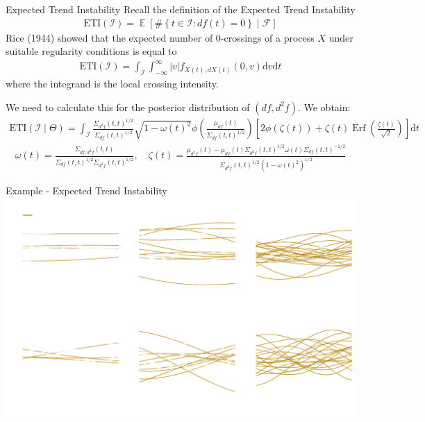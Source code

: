 \documentclass[ignorenonframetext,xcolor=pdflatex,table,dvipsnames,serif]{beamer}
\DeclareMathOperator{\E}{\mathbb{E}}
\DeclareMathOperator{\Erf}{Erf}
\begin{document}
\begin{frame}{Expected Trend Instability}
  Recall the definition of the Expected Trend Instability
  \begin{align*}
    \mathrm{ETI}(\mathcal{I}) = \E[\#\left\{t \in \mathcal{I} : df(t) = 0\right\} \mid \mathcal{F}]
  \end{align*}
  Rice (1944) showed that the expected number of 0-crossings of a process $X$ under suitable regularity conditions is equal to
  \begin{align*}
    \mathrm{ETI}(\mathcal{I}) = \int_\mathcal{I}\int_{-\infty}^\infty |v| f_{X(t), dX(t)}(0, v)\mathrm{d}v\mathrm{d}t
  \end{align*}
  where the integrand is the \alert{local crossing intensity}. 
  
  \pause
  
  \vspace{0.5cm}
  We need to calculate this for the posterior distribution of $(df, d^2\!f)$. We obtain:
{\tiny
  \begin{align*}
    \mathrm{ETI}(\mathcal{I} \mid \Theta) = \int_{\mathcal{I}} \frac{\Sigma_{d^2\!f}(t,t)^{1/2}}{\Sigma_{df}(t,t)^{1/2}} \sqrt{1 - \omega(t)^2}   \phi\left(\frac{\mu_{df}(t)}{\Sigma_{df}(t,t)^{1/2}}\right)\left[2\phi(\zeta(t)) + \zeta(t) \Erf\left(\frac{\zeta(t)}{\sqrt{2}}\right)\right]\mathrm{d}t
  \end{align*}
  \begin{align*}
  \omega(t) = \frac{\Sigma_{df,d^2\!f}(t,t)}{\Sigma_{df}(t,t)^{1/2}\Sigma_{d^2\!f}(t,t)^{1/2}}, \quad \zeta(t) = \frac{\mu_{d^2\!f}(t) - \mu_{df}(t)\Sigma_{d^2\!f}(t,t)^{1/2}\omega(t)\Sigma_{df}(t,t)^{-1/2}}{\Sigma_{d^2\!f}(t,t)^{1/2}(1 - \omega(t)^2)^{1/2}}
  \end{align*}
}
\end{frame}


\begin{frame}{Example - Expected Trend Instability}
  \center\includegraphics[scale=0.55]{ETIexample}
\end{frame}
\end{document}
